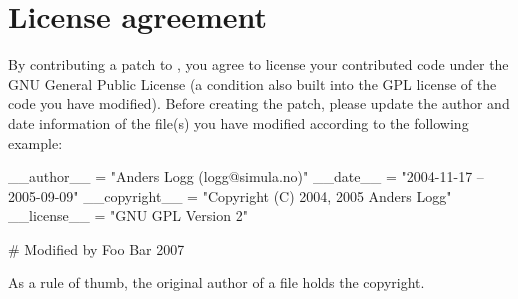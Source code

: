 

\section{License agreement}

By contributing a patch to \package{}, you agree to license your
contributed code under the GNU General Public License (a condition
also built into the GPL license of the code you have modified). Before
creating the patch, please update the author and date information of
the file(s) you have modified according to the following example:

\begin{code}
__author__ = "Anders Logg (logg@simula.no)"
__date__ = "2004-11-17 -- 2005-09-09"
__copyright__ = "Copyright (C) 2004, 2005 Anders Logg"
__license__  = "GNU GPL Version 2"

# Modified by Foo Bar 2007
\end{code}

As a rule of thumb, the original author of a file holds the copyright.
